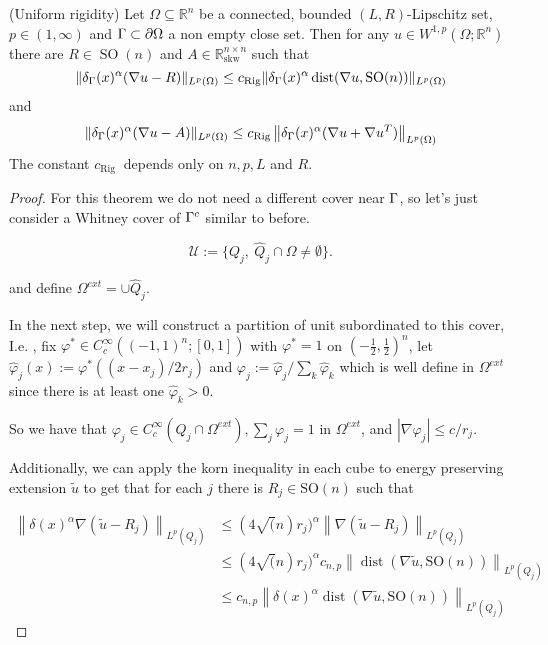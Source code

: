 \begin{theorem}\label{KornGamma}
(Uniform rigidity) Let $\Omega \subseteq \mathbb{R}^n$ be a connected, bounded $(L, R)$-Lipschitz set, $p \in(1, \infty)$ and $\Gamma\subset \partial\Omega$ a non empty close set. Then for any $u \in W^{1, p}\left(\Omega ; \mathbb{R}^n\right)$ there are $R \in \operatorname{SO}(n)$ and $A \in \mathbb{R}_{\mathrm{skw}}^{n \times n}$ such that
$$
\|\delta_\Gamma(x)^\alpha(\nabla u-R)\|_{L^p(\Omega)} \leq c_{\mathrm{Rig}}\|\delta_\Gamma(x)^\alpha\operatorname{dist}(\nabla u, \operatorname{SO}(n))\|_{L^p(\Omega)}
$$
and
$$
\|\delta_\Gamma(x)^\alpha(\nabla u-A)\|_{L^p(\Omega)} \leq c_{\operatorname{Rig}}\left\|\delta_\Gamma(x)^\alpha(\nabla u+\nabla u^T)\right\|_{L^p(\Omega)}
$$
The constant $c_{\text {Rig }}$ depends only on $n, p, L$ and $R$.
\end{theorem}
\begin{proof}
    For this theorem we do not need a different cover near $\Gamma$, so let's just  consider a Whitney cover of $\Gamma^c$ similar to before.
    
    $$\mathcal{U}:= \{Q_j,\ \hat{Q}_j\cap\Omega\neq \emptyset \}.$$
    
    and define $\Omega^{ext}= \cup \hat{Q}_j$.

    In the next step, we will construct a partition of unit subordinated to this cover,  I.e. , fix $\varphi^* \in C_c^{\infty}\left((-1,1)^n ;[0,1]\right)$ with $\varphi^*=1$ on $\left(-\frac{1}{2}, \frac{1}{2}\right)^n$, let $\hat{\varphi}_j(x):=\varphi^*\left(\left(x-x_j\right) / 2r_j\right)$ and $\varphi_j:=\hat{\varphi}_j / \sum_k \hat{\varphi}_k$ which is well define in $\Omega^{ext}$ since there is at least one $\hat{\varphi}_k>0$.
    
    So we have that $\varphi_j \in C_c^{\infty}\left(Q_j\cap \Omega^{ext}\right), \sum_j \varphi_j=1$ in $\Omega^{ext}$, and $\left|\nabla \varphi_j\right| \leq c / r_j$. 
    
    Additionally, we can apply the korn inequality in each cube to energy preserving extension $\tilde{u}$ to get that for each $j$ there is $R_j \in \mathrm{SO}(n)$ such that


\begin{align*}    
\left\|\delta(x)^\alpha\nabla (\tilde{u}-R_j)\right\|_{L^p(Q_j)} & \leq (4\sqrt(n) r_j)^\alpha \left\|\nabla (\tilde{u}-R_j)\right\|_{L^p(Q_j)}\\ &\leq  (4\sqrt(n) r_j)^\alpha c_{n, p}\left\|\operatorname{dist}\left(\nabla \tilde{u}, \mathrm{SO}(n)\right)\right\|_{L^p(Q_j)}\\
&\leq c_{n,p}  \left\|\delta(x)^\alpha \operatorname{dist}\left(\nabla \tilde{u}, \mathrm{SO}(n)\right)\right\|_{L^p(Q_j)}
\end{align*}


\end{proof}
